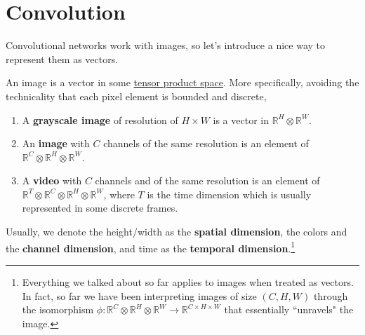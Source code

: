 \section{Convolution} 

  Convolutional networks work with images, so let's introduce a nice way to represent them as vectors. 

  \begin{definition}[Image]
    \label{def:image}
    An image is a vector in some \hyperref[lin-def:tensor]{tensor product space}. More specifically, avoiding the technicality that each pixel element is bounded and discrete, 

    \begin{enumerate}
      \item A \textbf{grayscale image} of resolution of $H \times W$ is a vector in $\mathbb{R}^{H} \otimes \mathbb{R}^{W}$. 
      \item An \textbf{image} with $C$ channels of the same resolution is an element of $\mathbb{R}^{C} \otimes \mathbb{R}^H \otimes \mathbb{R}^W$. 
      \item A \textbf{video} with $C$ channels and of the same resolution is an element of $\mathbb{R}^T \otimes \mathbb{R}^C \otimes \mathbb{R}^H \otimes \mathbb{R}^W$, where $T$ is the time dimension which is usually represented in some discrete frames.
    \end{enumerate} 
    Usually, we denote the height/width as the \textbf{spatial dimension}, the colors and the \textbf{channel dimension}, and time as the \textbf{temporal dimension}.\footnote{Everything we talked about so far applies to images when treated as vectors. In fact, so far we have been interpreting images of size $(C, H, W)$ through the isomorphism $\phi: \mathbb{R}^{C} \otimes \mathbb{R}^H \otimes \mathbb{R}^W \rightarrow \mathbb{R}^{C \times H \times W}$ that essentially ``unravels" the image. }
  \end{definition}

